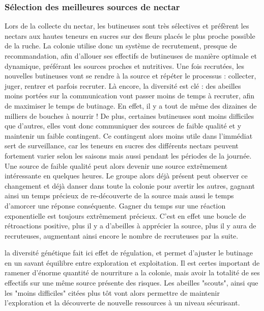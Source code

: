 			\subsubsection{Sélection des meilleures sources de nectar}
			Lors de la collecte du nectar, les butineuses sont très sélectives et préfèrent les nectars aux hautes teneurs en sucres sur des fleurs placés le plus proche possible de la ruche. La colonie utilise donc un système de recrutement, presque de recommandation, afin d'allouer ses effectifs de butineuses de manière optimale et dynamique, préférant les sources proches et nutritives.
			Une fois recrutées, les nouvelles butineuses vont se rendre à la source et répéter le processus : collecter, juger, rentrer et parfois recruter. Là encore, la diversité est clé : des abeilles moins portées sur la communication vont passer moins de temps à recruter, afin de maximiser le temps de butinage. En effet, il y a tout de même des dizaines de milliers de bouches à nourrir ! De plus, certaines butineuses sont moins difficiles que d'autres, elles vont donc communiquer des sources de faible qualité et y maintenir un faible contingent. Ce contingent alors moins utile dans l'immédiat sert de surveillance, car les teneurs en sucres des différents nectars peuvent fortement varier selon les saisons mais aussi pendant les périodes de la journée. Une source de faible qualité peut alors devenir une source extrêmement intéressante en quelques heures. Le groupe alors déjà présent peut observer ce changement et déjà danser dans toute la colonie pour avertir les autres, gagnant ainsi un temps précieux de re-découverte de la source mais aussi le temps d'amorcer une réponse conséquente. Gagner du temps sur une réaction exponentielle est toujours extrêmement précieux. C'est en effet une boucle de rétroactions positive, plus il y a d'abeilles à apprécier la source, plus il y aura de recruteuses, augmentant ainsi encore le nombre de recruteuses par la suite.
			
			la diversité génétique fait ici effet de régulation, et permet d'ajuster le butinage en un savant équilibre entre exploration et exploitation. Il est certes important de ramener d'énorme quantité de nourriture a la colonie, mais avoir la totalité de ses effectifs sur une même source présente des risques. Les abeilles "scouts", ainsi que les "moins difficiles" citées plus tôt vont alors permettre de maintenir l'exploration et la découverte de nouvelle ressources à un niveau sécurisant.
			
